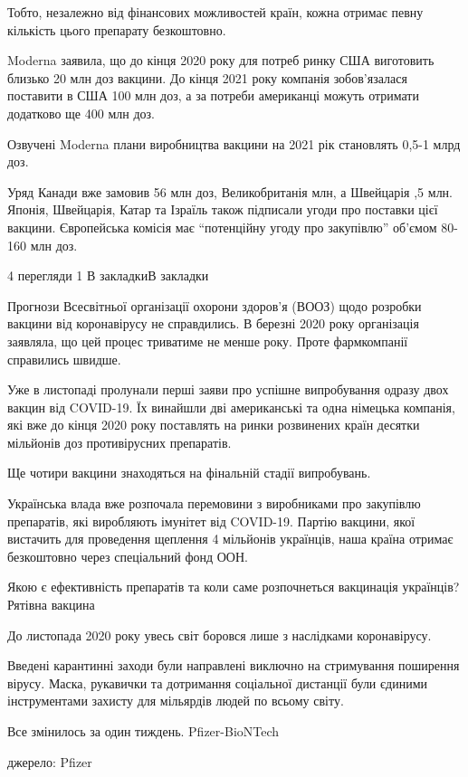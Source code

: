 Тобто, незалежно від фінансових можливостей країн, кожна отримає певну
кількість цього препарату безкоштовно.

Moderna заявила, що до кінця 2020 року для потреб ринку США виготовить близько
20 млн доз вакцини. До кінця 2021 року компанія зобов’язалася поставити в США
100 млн доз, а за потреби американці можуть отримати додатково ще 400 млн доз.

Озвучені Moderna плани виробництва вакцини на 2021 рік становлять 0,5-1 млрд доз.

Уряд Канади вже замовив 56 млн доз, Великобританія  млн, а Швейцарія ,5
млн. Японія, Швейцарія, Катар та Ізраїль також підписали угоди про поставки
цієї вакцини. Європейська комісія має \enquote{потенційну угоду про закупівлю} об’ємом
80-160 млн доз.



4 перегляди
1
		В закладкиВ закладки

Прогнози Всесвітньої організації охорони здоров'я (ВООЗ) щодо розробки вакцини від коронавірусу не справдились. В березні 2020 року організація заявляла, що цей процес триватиме не менше року. Проте фармкомпанії справились швидше.

Уже в листопаді пролунали перші заяви про успішне випробування одразу двох вакцин від COVID-19. Їх винайшли дві американські та одна німецька компанія, які вже до кінця 2020 року поставлять на ринки розвинених країн десятки мільйонів доз противірусних препаратів.

Ще чотири вакцини знаходяться на фінальній стадії випробувань.

Українська влада вже розпочала перемовини з виробниками про закупівлю препаратів, які виробляють імунітет від COVID-19. Партію вакцини, якої вистачить для проведення щеплення 4 мільйонів українців, наша країна отримає безкоштовно через спеціальний фонд ООН.

Якою є ефективність препаратів та коли саме розпочнеться вакцинація українців?
Рятівна вакцина

До листопада 2020 року увесь світ боровся лише з наслідками коронавірусу.

Введені карантинні заходи були направлені виключно на стримування поширення вірусу. Маска, рукавички та дотримання соціальної дистанції були єдиними інструментами захисту для мільярдів людей по всьому світу.

Все змінилось за один тиждень.
Pfizer-BioNTech
 
джерело: Pfizer


